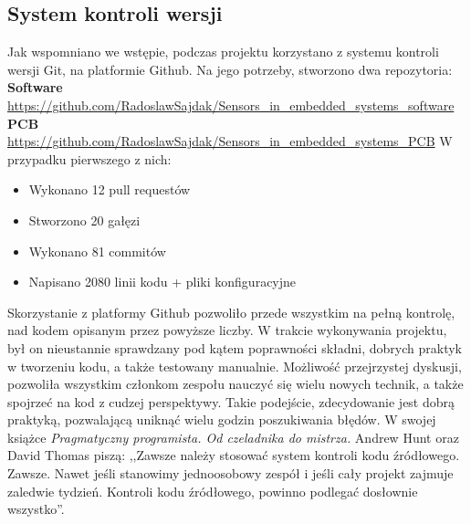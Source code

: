 \subsection{System kontroli wersji}
Jak wspomniano we wstępie, podczas projektu korzystano z systemu kontroli wersji Git, na platformie Github. Na jego potrzeby, stworzono dwa repozytoria:\newline
\textbf{Software}\newline
\url{https://github.com/RadoslawSajdak/Sensors_in_embedded_systems_software}\newline
\textbf{PCB}\newline
\url{https://github.com/RadoslawSajdak/Sensors_in_embedded_systems_PCB}\newline
\newline
W przypadku pierwszego z nich:
\begin{itemize}
    \item Wykonano 12 pull requestów
    \item Stworzono 20 gałęzi
    \item Wykonano 81 commitów
    \item Napisano 2080 linii kodu + pliki konfiguracyjne
\end{itemize}
Skorzystanie z platformy Github pozwoliło przede wszystkim na pełną kontrolę, nad kodem opisanym przez powyższe liczby. W trakcie wykonywania projektu, był on nieustannie sprawdzany pod kątem poprawności składni, dobrych praktyk w tworzeniu kodu, a także testowany manualnie. Możliwość przejrzystej dyskusji, pozwoliła wszystkim członkom zespołu nauczyć się wielu nowych technik, a także spojrzeć na kod z cudzej perspektywy. Takie podejście, zdecydowanie jest dobrą praktyką, pozwalającą uniknąć wielu godzin poszukiwania błędów. W swojej książce \textit{Pragmatyczny programista. Od czeladnika do mistrza.} Andrew Hunt oraz David Thomas piszą: ,,Zawsze należy stosować system kontroli kodu źródłowego. Zawsze. Nawet jeśli stanowimy jednoosobowy zespół i jeśli cały projekt zajmuje zaledwie tydzień. Kontroli kodu źródłowego, powinno podlegać dosłownie wszystko''\cite{pragmatic}.